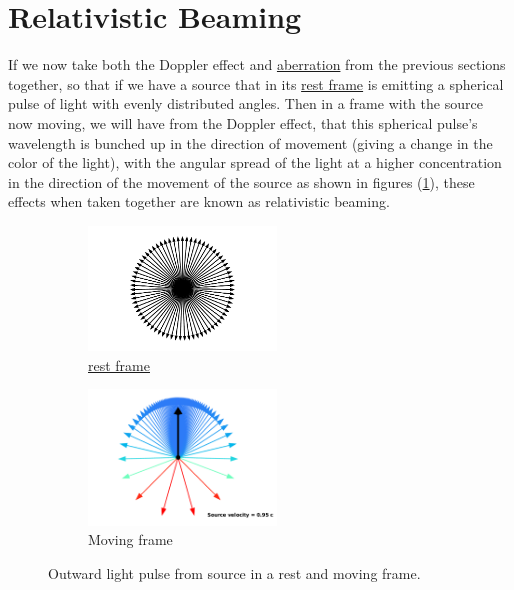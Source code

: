 \section{Relativistic Beaming}

If we now take both the Doppler effect and \hyperlink{def-aberration}{aberration} from the previous sections together, so that if we have a source that in its \hyperlink{def-proper-frame}{rest frame} is emitting a spherical pulse of light with evenly distributed angles. Then in a frame with the source now moving, we will have from the Doppler effect, that this spherical pulse's wavelength is bunched up in the direction of movement (giving a change in the color of the light), with the angular spread of the light at a higher concentration in the direction of the movement of the source as shown in figures (\ref{fig: Relativistic Beaming}), these effects when taken together are known as relativistic beaming.

\begin{figure}[H]
	\begin{subfigure}{.49\textwidth}
		\centering
		\includegraphics[width=5cm]{images/pdf/Rest_velocities.pdf}
		\caption{\hyperlink{def-proper-frame}{rest frame}}
	\end{subfigure}
	\begin{subfigure}{.49\textwidth}
		\centering
		\includegraphics[width=5cm]{images/pdf/Aberrated_velocities.pdf}
		\caption{Moving frame}
	\end{subfigure}
	\caption{Outward light pulse from source in a rest and moving frame.}
	\label{fig: Relativistic Beaming}
\end{figure}

